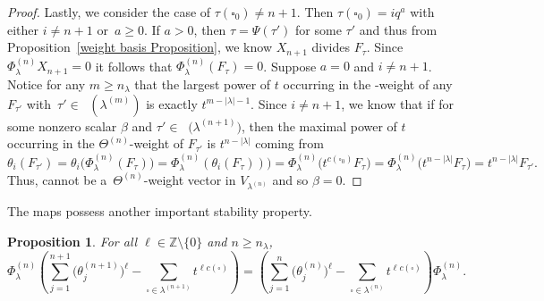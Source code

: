\documentclass[pdftex]{sigma}
\numberwithin{equation}{section}
\newtheorem{Proposition}[Theorem]{Proposition}
\theoremstyle{definition}
\DeclareMathOperator{\PSYT}{\mathrm{PSYT}_{\geq 0}}
\begin{document}
\begin{proof}
 Lastly, we consider the case of $\tau(\square_0) \neq n+1$. Then $\tau(\square_0) = iq^a$ with either $i \neq n+1$ or~${a \geq 0}$. If $a >0$, then $\tau = \Psi(\tau')$ for some $\tau'$ and thus from Proposition~\ref{weight basis Proposition}, we know $X_{n+1}$ divides $F_{\tau}$. Since $\Phi^{(n)}_{\lambda}X_{n+1} = 0$ it follows that $\Phi^{(n)}_{\lambda}(F_{\tau}) =0$. Suppose $a = 0$ and $i \neq n+1$. Notice for any $m \geq n_{\lambda}$ that the largest power of $t$ occurring in the -weight of any $F_{\tau'}$ with~${\tau' \in \PSYT(\lambda^{(m)})}$ is exactly $t^{m-|\lambda|-1}$. Since $i \neq n+1$, we know that if  for some nonzero scalar $\beta$ and $\tau' \in \PSYT\bigl(\lambda^{(n+1)}\bigr)$, then the maximal power of $t$ occurring in the $\Theta^{(n)}$-weight of $F_{\tau'}$ is $t^{n-|\lambda|}$ coming from
 \[
 \theta_i(F_{\tau'}) = \theta_i\bigl( \Phi^{(n)}_{\lambda}(F_{\tau})\bigr)= \Phi^{(n)}_{\lambda}(\theta_i(F_{\tau})))= \Phi^{(n)}_{\lambda}\bigl( t^{c(\square_0)}F_{\tau}\bigr)= \Phi^{(n)}_{\lambda}\bigl( t^{n-|\lambda|}F_{\tau}\bigr)= t^{n-|\lambda|} F_{\tau'}.
 \]
 Thus,  cannot be a~$\Theta^{(n)}$-weight vector in $V_{\lambda^{(n)}}$ and so $\beta=0$.
\end{proof}

The maps  possess another important stability property.

\begin{Proposition}\label{connecting maps and symmetrization of thetas}
 For all $\ell \in \mathbb{Z}\setminus \{0\}$ and $n \geq n_{\lambda}$,
 \[
 \Phi^{(n)}_{\lambda}\left( \sum_{j=1}^{n+1}\bigl(\theta^{(n+1)}_j\bigr)^{\ell} - \sum_{\square \in \lambda^{(n+1)}} t^{\ell c(\square)} \right) = \left( \sum_{j=1}^{n}\bigl(\theta^{(n)}_j\bigr)^{\ell} - \sum_{\square \in \lambda^{(n)}} t^{\ell c(\square)} \right) \Phi^{(n)}_{\lambda}.
 \]

\end{Proposition}
\end{document}
